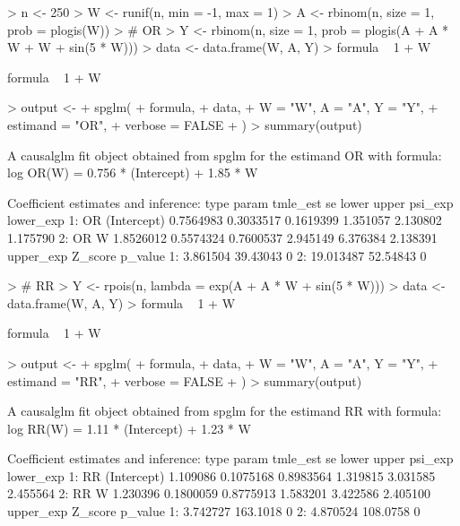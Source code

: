 \documentclass[article]{jss}
\begin{document}
\begin{Schunk}
\begin{Sinput}
> n <- 250
> W <- runif(n, min = -1, max = 1)
> A <- rbinom(n, size = 1, prob = plogis(W))
> # OR
> Y <- rbinom(n, size = 1, prob = plogis(A + A * W + W + sin(5 * W)))
> data <- data.frame(W, A, Y)
> formula ~ 1 + W
\end{Sinput}
\begin{Soutput}
formula ~ 1 + W
\end{Soutput}
\begin{Sinput}
> output <-
+   spglm(
+     formula,
+     data,
+     W = "W", A = "A", Y = "Y",
+     estimand = "OR",
+     verbose = FALSE
+   )
> summary(output)
\end{Sinput}
\begin{Soutput}
A causalglm fit object obtained from spglm for the estimand OR with formula: 
log OR(W) = 0.756 * (Intercept) + 1.85 * W

Coefficient estimates and inference:
   type       param  tmle_est        se     lower    upper  psi_exp lower_exp
1:   OR (Intercept) 0.7564983 0.3033517 0.1619399 1.351057 2.130802  1.175790
2:   OR           W 1.8526012 0.5574324 0.7600537 2.945149 6.376384  2.138391
   upper_exp  Z_score p_value
1:  3.861504 39.43043       0
2: 19.013487 52.54843       0
\end{Soutput}
\begin{Sinput}
> # RR
> Y <- rpois(n, lambda = exp(A + A * W + sin(5 * W)))
> data <- data.frame(W, A, Y)
> formula ~ 1 + W
\end{Sinput}
\begin{Soutput}
formula ~ 1 + W
\end{Soutput}
\begin{Sinput}
> output <-
+   spglm(
+     formula,
+     data,
+     W = "W", A = "A", Y = "Y",
+     estimand = "RR",
+     verbose = FALSE
+   )
> summary(output)
\end{Sinput}
\begin{Soutput}
A causalglm fit object obtained from spglm for the estimand RR with formula: 
log RR(W) = 1.11 * (Intercept) + 1.23 * W

Coefficient estimates and inference:
   type       param tmle_est        se     lower    upper  psi_exp lower_exp
1:   RR (Intercept) 1.109086 0.1075168 0.8983564 1.319815 3.031585  2.455564
2:   RR           W 1.230396 0.1800059 0.8775913 1.583201 3.422586  2.405100
   upper_exp  Z_score p_value
1:  3.742727 163.1018       0
2:  4.870524 108.0758       0
\end{Soutput}
\end{Schunk}
\end{document}
